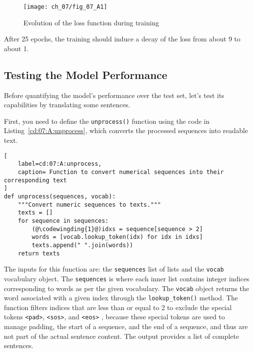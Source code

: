 \begin{figure}[H]
	\texttt{[image: ch\_07/fig\_07\_A1]} 
	\caption{Evolution of the loss function during training}
	\label{fig:07:loss}
\end{figure}

After 25 epochs, the training should induce a decay of the loss from about 9 to about 1.
\fi

\subsection{Testing the Model Performance}

Before quantifying the model's performance over the test set, let's test its  capabilities by translating some sentences. 

First, you need to define the \lstinline{unprocess()} function using the code in Listing~\ref{cd:07:A:unprocess}, which converts the processed sequences into readable text.
\begin{lstlisting}[
    label=cd:07:A:unprocess,
    caption= Function to convert numerical sequences into their corresponding text
]
def unprocess(sequences, vocab):
    """Convert numeric sequences to texts."""
    texts = []
    for sequence in sequences:
        (@\codewingding{1}@)idxs = sequence[sequence > 2]
        words = [vocab.lookup_token(idx) for idx in idxs]
        texts.append(" ".join(words))
    return texts
\end{lstlisting}
The inputs for this function are: the \lstinline{sequences} list of lists and the \lstinline{vocab} vocabulary object. The \lstinline{sequences} is where each inner list contains integer indices corresponding to words as per the given vocabulary. The \lstinline{vocab} object returns the word associated with a given index through the \lstinline{lookup_token()} method. The function filters indices that are less than or equal to 2 to exclude the special tokens \lstinline{<pad>}, \lstinline{<sos>}, and \lstinline{<eos>} , because these special tokens are used to manage padding, the start of a sequence, and the end of a sequence, and thus are not part of the actual sentence content. The output provides a list of complete sentences.

